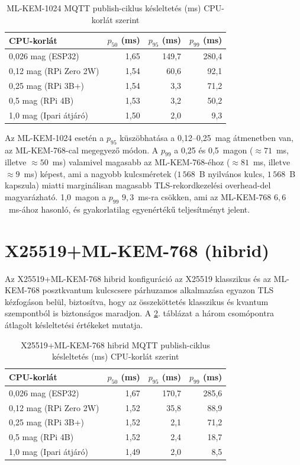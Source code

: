 \begin{table}[ht]
\centering
\caption{ML-KEM-1024 MQTT publish-ciklus késleltetés (ms) CPU-korlát szerint}
\label{tab:mlkem1024-latency}
\begin{tabular}{lrrr}
\hline
\textbf{CPU-korlát} & \textbf{$p_{50}$ (ms)} & \textbf{$p_{95}$ (ms)} & \textbf{$p_{99}$ (ms)} \\
\hline
0,026 mag (ESP32)       & 1,65 & 149,7 & 280,4 \\
0,12 mag (RPi Zero 2W)  & 1,54 &  60,6 &  92,1 \\
0,25 mag (RPi 3B+)      & 1,54 &   3,3 &  71,2 \\
0,5 mag (RPi 4B)        & 1,53 &   3,2 &  50,2 \\
1,0 mag (Ipari átjáró)  & 1,50 &   2,0 &   9,3 \\
\hline
\end{tabular}
\end{table}

Az ML-KEM-1024 esetén a $p_{95}$ küszöbhatása a 0,12--0,25~mag átmenetben van, az
ML-KEM-768-cal megegyező módon. A $p_{99}$ a 0,25 és 0,5~magon ($\approx 71$~ms,
illetve $\approx 50$~ms) valamivel magasabb az ML-KEM-768-éhoz ($\approx 81$~ms, illetve
$\approx 9$~ms) képest, ami a nagyobb kulcsméretek ($1\,568$~B nyilvános kulcs,
$1\,568$~B kapszula) miatti marginálisan magasabb TLS-rekordkezelési overhead-del
magyarázható. 1,0~magon a $p_{99}$ $9{,}3$~ms-ra csökken, ami az ML-KEM-768
$6{,}6$~ms-ához hasonló, és gyakorlatilag egyenértékű teljesítményt jelent.

\section{X25519+ML-KEM-768 (hibrid)}

Az X25519+ML-KEM-768 hibrid konfiguráció az X25519 klasszikus és az ML-KEM-768
posztkvantum kulcscsere párhuzamos alkalmazása egyazon TLS kézfogáson belül,
biztosítva, hogy az összeköttetés klasszikus és kvantum szempontból is biztonságos
maradjon. A \ref{tab:hybrid-latency}. táblázat a három csomópontra átlagolt
késleltetési értékeket mutatja.

\begin{table}[ht]
\centering
\caption{X25519+ML-KEM-768 hibrid MQTT publish-ciklus késleltetés (ms) CPU-korlát szerint}
\label{tab:hybrid-latency}
\begin{tabular}{lrrr}
\hline
\textbf{CPU-korlát} & \textbf{$p_{50}$ (ms)} & \textbf{$p_{95}$ (ms)} & \textbf{$p_{99}$ (ms)} \\
\hline
0,026 mag (ESP32)       & 1,67 & 170,7 & 285,6 \\
0,12 mag (RPi Zero 2W)  & 1,52 &  35,8 &  88,9 \\
0,25 mag (RPi 3B+)      & 1,52 &   2,1 &  71,2 \\
0,5 mag (RPi 4B)        & 1,52 &   2,4 &  18,7 \\
1,0 mag (Ipari átjáró)  & 1,49 &   2,0 &   8,5 \\
\hline
\end{tabular}
\end{table}

